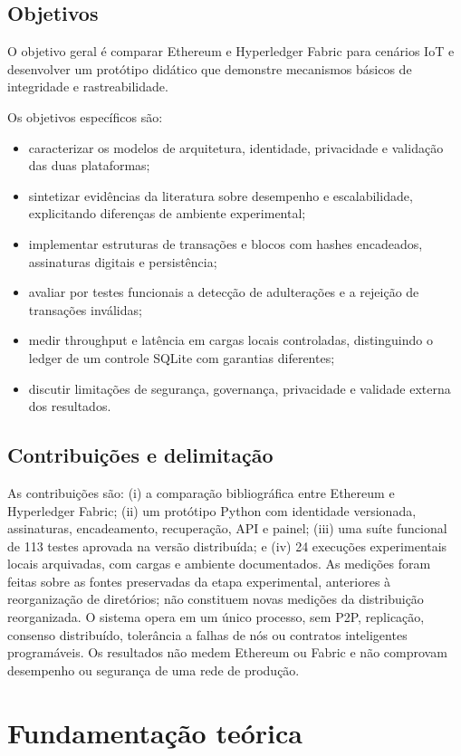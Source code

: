 \documentclass[10pt,a4paper,twocolumn]{article}
\begin{document}
\subsection{Objetivos}
O objetivo geral é comparar Ethereum e Hyperledger Fabric para cenários IoT e desenvolver um protótipo didático que demonstre mecanismos básicos de integridade e rastreabilidade.

Os objetivos específicos são:
\begin{itemize}
  \item caracterizar os modelos de arquitetura, identidade, privacidade e validação das duas plataformas;
  \item sintetizar evidências da literatura sobre desempenho e escalabilidade, explicitando diferenças de ambiente experimental;
  \item implementar estruturas de transações e blocos com hashes encadeados, assinaturas digitais e persistência;
  \item avaliar por testes funcionais a detecção de adulterações e a rejeição de transações inválidas;
  \item medir throughput e latência em cargas locais controladas, distinguindo o ledger de um controle SQLite com garantias diferentes;
  \item discutir limitações de segurança, governança, privacidade e validade externa dos resultados.
\end{itemize}

\subsection{Contribuições e delimitação}
As contribuições são: (i) a comparação bibliográfica entre Ethereum e Hyperledger Fabric; (ii) um protótipo Python com identidade versionada, assinaturas, encadeamento, recuperação, API e painel; (iii) uma suíte funcional de 113 testes aprovada na versão distribuída; e (iv) 24 execuções experimentais locais arquivadas, com cargas e ambiente documentados. As medições foram feitas sobre as fontes preservadas da etapa experimental, anteriores à reorganização de diretórios; não constituem novas medições da distribuição reorganizada. O sistema opera em um único processo, sem P2P, replicação, consenso distribuído, tolerância a falhas de nós ou contratos inteligentes programáveis. Os resultados não medem Ethereum ou Fabric e não comprovam desempenho ou segurança de uma rede de produção.

\section{Fundamentação teórica}
\end{document}
